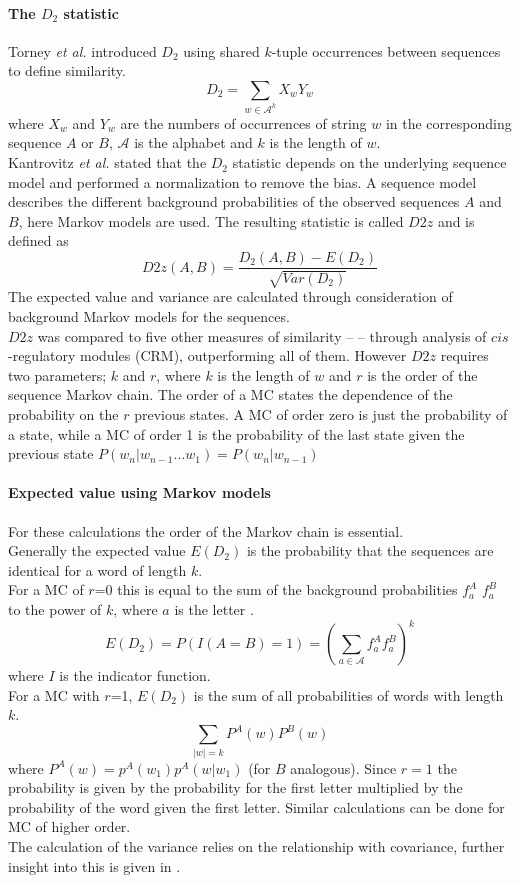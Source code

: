 \documentclass[twocolumn]{bmcart}%
\begin{document}
\paragraph*{The $D_2$ statistic}
Torney \textit{et al.}\cite{torney1990computation} introduced $D_2$  using shared $k$-tuple  occurrences between sequences to define similarity.
$$D_2=\sum_{w\in \mathcal{A}^k}X_wY_w$$
where $X_w$ and $Y_w$ are the numbers of occurrences of string $w$ in the corresponding sequence $A$ or $B$, $ \mathcal{A}$ is the alphabet and $k$ is the length of $w$.\\
Kantrovitz \textit{et al.}\cite{kantorovitz2007statistical} stated that the $D_2$ statistic depends on the  underlying sequence model and performed a normalization to remove the bias. A sequence model describes the different background probabilities of the observed sequences $A$ and $B$, here Markov models are used.
The resulting statistic is called $D2z$ and is defined as
$$D2z(A,B)=\frac{D_2(A,B)-E(D_2)}{\sqrt{Var(D_2)}}$$
The expected value and variance are calculated through consideration of background Markov models for the sequences.\\
$D2z$ was compared to five other measures of similarity -- \cite{doi:10.1093/bib/bbt067,kantorovitz2007statistical} -- through analysis of $cis$-regulatory modules (CRM), outperforming all of them. However $D2z$ requires two parameters; $k$ and $r$, where $k$ is the length of $w$ and $r$ is the order of the sequence Markov chain. The order of a MC states the dependence of the probability on the $r$ previous states. A MC of order zero is just the probability of a state, while a MC of order 1 is the probability of the last state given the previous state $P(w_n|w_{n-1}\dots w_1)=P(w_n|w_{n-1})$\\
\paragraph*{Expected value using Markov models}
For these calculations the order of the Markov chain is essential.\\
Generally the expected value $E(D_2)$ is the probability that the sequences are identical for a word of length $k$. \\
For a MC of $r$=0 this is equal to  the sum of the background probabilities $f_a^A$ $f_a^B$ to the power of $k$, where $a$ is the letter .
$$E(D_2)=P(I(A=B)=1)=\left(\sum_{a \in \mathcal{A}}f_a^Af_a^B\right)^k$$
where $I$ is the indicator function.\\
For a MC with $r$=1, $E(D_2)$ is the sum of all probabilities of words with length $k$. $$\sum_{|w|=k}P^A(w)P^B(w)$$
where $P^A(w)=p^A(w_1)p^A(w|w_1)$ (for $B$ analogous). Since $r=1$ the probability is given by the probability for the first letter multiplied by the probability of the word given the first letter. Similar calculations can be done for MC of higher order.\\
The calculation of the variance relies on the relationship with covariance, further insight into this is given in \cite{kantorovitz2007statistical}.
\end{document}
